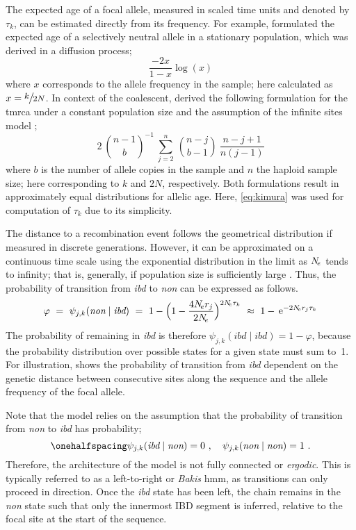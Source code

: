 The expected age of a focal allele, measured in scaled time units and denoted by $\tau_k$, can be estimated directly from its frequency.
For example, \citet{Kimura:1973ug} formulated the expected age of a selectively neutral allele in a stationary population, which was derived in a diffusion process;
\begin{equation}\label{eq:kimura}
	\frac{-2x}{1-x} \log(x)
\end{equation}
where $x$ corresponds to the allele frequency in the sample; here calculated as ${x = \large \sfrac{k}{2N}}$.
In context of the coalescent, \citet{Griffiths:2013ec} derived the following formulation for the \gls{tmrca} under a constant population size and the assumption of the infinite sites model \citep{Kimura:1969tn,Watterson:1975ur};
\begin{equation}\label{eq:griffiths}
	2  ~ {{n-1}\choose{b}}^{-1} ~ \sum_{j=2}^{n} ~ {{n-j}\choose{b-1}} ~ \frac{n-j+1}{n(j-1)}
\end{equation}
where $b$ is the number of allele copies in the sample and $n$ the haploid sample size; here corresponding to $k$ and $2N$, respectively.
Both formulations result in approximately equal distributions for allelic age.
Here, \cref{eq:kimura} was used for computation of $\tau_k$ due to its simplicity.

The distance to a recombination event follows the geometrical distribution if measured in discrete generations.
However, it can be approximated on a continuous time scale using the exponential distribution in the limit as $N_{\!e}$ tends to infinity; that is, generally, if population size is sufficiently large \citep[see][]{hein2004gene}.
Thus, the probability of transition from \emph{ibd} to \emph{non} can be expressed as follows.
\begin{equation}\label{eq:hmm_trans_prob}
	\varphi ~=~ \psi_{j,k}(\textit{non}\mid\textit{ibd}) ~=~
	1 - \Big( 1 - \frac{4N_{\!e} r_j}{2N_{\!e}} \Big)^{2N_{\!e}\tau_k} ~\approx~
	1 - \,\mathrm{e}^{-2N_{\!e} r_j \tau_k}
\end{equation}
The probability of remaining in \emph{ibd} is therefore ${\psi_{j,k}(\textit{ibd}\mid\textit{ibd}) = 1-\varphi}$, because the probability distribution over possible states for a given state must sum to~1.
For illustration,  shows the probability of transition from \emph{ibd} dependent on the genetic distance between consecutive sites along the sequence and the allele frequency of the focal allele.

Note that the model relies on the assumption that the probability of transition from \emph{non} to \emph{ibd} has  probability; \ie
\begin{equation*}\onehalfspacing
	\psi_{j,k}(\textit{ibd}\mid\textit{non}) = 0\ , \quad
	\psi_{j,k}(\textit{non}\mid\textit{non}) = 1\ .
\end{equation*}
Therefore, the architecture of the model is not fully connected or \emph{ergodic}.
This is typically referred to as a left-to-right or \emph{Bakis} \gls{hmm}, as transitions can only proceed in  direction.
Once the \emph{ibd} state has been left, the chain remains in the \emph{non} state such that only the innermost IBD segment is inferred, relative to the focal site at the start of the sequence.

